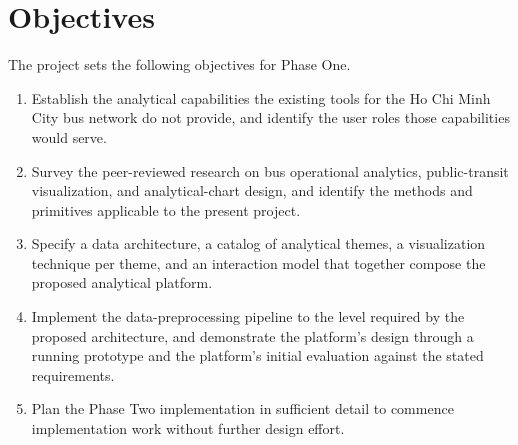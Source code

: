 \section{Objectives}
\label{sec:intro:objectives}

The project sets the following objectives for Phase One.

\begin{enumerate}
\item Establish the analytical capabilities the existing tools for the
Ho Chi Minh City bus network do not provide, and identify the user
roles those capabilities would serve.
\item Survey the peer-reviewed research on bus operational analytics,
public-transit visualization, and analytical-chart design, and
identify the methods and primitives applicable to the present
project.
\item Specify a data architecture, a catalog of analytical themes, a
visualization technique per theme, and an interaction model that
together compose the proposed analytical platform.
\item Implement the data-preprocessing pipeline to the level required
by the proposed architecture, and demonstrate the platform's design
through a running prototype and the platform's
initial evaluation against the stated requirements.
\item Plan the Phase Two implementation in sufficient detail to
commence implementation work without further design effort.
\end{enumerate}
